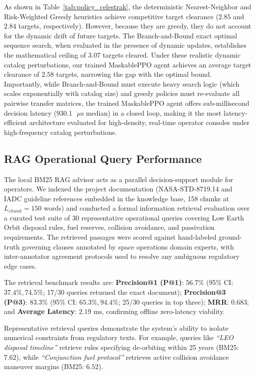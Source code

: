\documentclass[10pt,conference,a4paper]{IEEEtran}
\begin{document}
As shown in Table~\ref{tab:policy_celestrak}, the deterministic Nearest-Neighbor and Risk-Weighted Greedy heuristics achieve competitive target clearance ($2.85$ and $2.84$ targets, respectively). However, because they are greedy, they do not account for the dynamic drift of future targets. The Branch-and-Bound exact optimal sequence search, when evaluated in the presence of dynamic updates, establishes the mathematical ceiling of $3.07$ targets cleared. Under these realistic dynamic catalog perturbations, our trained MaskablePPO agent achieves an average target clearance of $\mathbf{2.58}$ targets, narrowing the gap with the optimal bound. Importantly, while Branch-and-Bound must execute heavy search logic (which scales exponentially with catalog size) and greedy policies must re-evaluate all pairwise transfer matrices, the trained MaskablePPO agent offers sub-millisecond decision latency ($930.1\text{ }\mu\text{s}$ median) in a closed loop, making it the most latency-efficient architecture evaluated for high-density, real-time operator consoles under high-frequency catalog perturbations.

\subsection{RAG Operational Query Performance}
The local BM25 RAG advisor acts as a parallel decision-support module for operators. We indexed the project documentation (NASA-STD-8719.14 and IADC guideline references embedded in the knowledge base, 158 chunks at $L_{chunk}=150$ words) and conducted a formal information retrieval evaluation over a curated test suite of 30 representative operational queries covering Low Earth Orbit disposal rules, fuel reserves, collision avoidance, and passivation requirements. The retrieved passages were scored against hand-labeled ground-truth governing clauses annotated by space operations domain experts, with inter-annotator agreement protocols used to resolve any ambiguous regulatory edge cases.

The retrieval benchmark results are: \textbf{Precision@1 (P@1)}: $56.7\%$ (95\% CI: $37.4\%, 74.5\%$; 17/30 queries returned the exact document); \textbf{Precision@3 (P@3)}: $83.3\%$ (95\% CI: $65.3\%, 94.4\%$; 25/30 queries in top three); \textbf{MRR}: $0.683$; and \textbf{Average Latency}: $2.19\text{ ms}$, confirming offline zero-latency viability.

Representative retrieval queries demonstrate the system's ability to isolate numerical constraints from regulatory texts. For example, queries like \textit{``LEO disposal timeline''} retrieve rules specifying de-orbiting within 25 years (BM25: $7.62$), while \textit{``Conjunction fuel protocol''} retrieves active collision avoidance maneuver margins (BM25: $6.52$).
\end{document}
